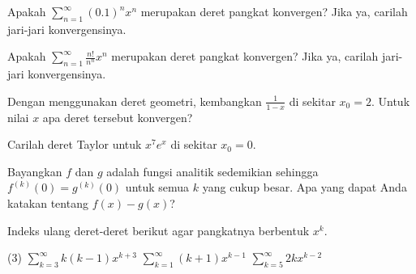\setcounter{exercise}{100}

\begin{exercise}
Apakah
$\displaystyle \sum_{n=1}^\infty {(0.1)}^n x^n$
merupakan deret pangkat konvergen?
Jika ya, carilah jari-jari konvergensinya.
\end{exercise}

\begin{exercise}[menantang]
Apakah
$\displaystyle \sum_{n=1}^\infty \frac{n!}{n^n} x^n$
merupakan deret pangkat konvergen?
Jika ya, carilah jari-jari konvergensinya.
\end{exercise}

\begin{exercise}
Dengan menggunakan deret geometri, kembangkan $\frac{1}{1-x}$ di sekitar $x_0=2$.
Untuk nilai $x$ apa deret tersebut konvergen?
\end{exercise}

\begin{exercise}[menantang]
Carilah deret Taylor untuk $x^7 e^x$ di sekitar $x_0 = 0$.
\end{exercise}

\begin{exercise}[menantang]
Bayangkan $f$ dan $g$ adalah fungsi analitik sedemikian sehingga
$f^{(k)}(0) = g^{(k)}(0)$ untuk semua $k$ yang cukup besar. Apa yang dapat Anda
katakan tentang $f(x)-g(x)$?
\end{exercise}

\begin{exercise}
Indeks ulang deret-deret berikut agar pangkatnya berbentuk $x^k$.
\begin{tasks}(3)
\task $\displaystyle \sum_{k=3}^\infty k(k-1)x^{k+3}$
\task $\displaystyle \sum_{k=1}^\infty (k+1)x^{k-1}$
\task $\displaystyle \sum_{k=5}^\infty 2kx^{k-2}$
\end{tasks}
\end{exercise}



